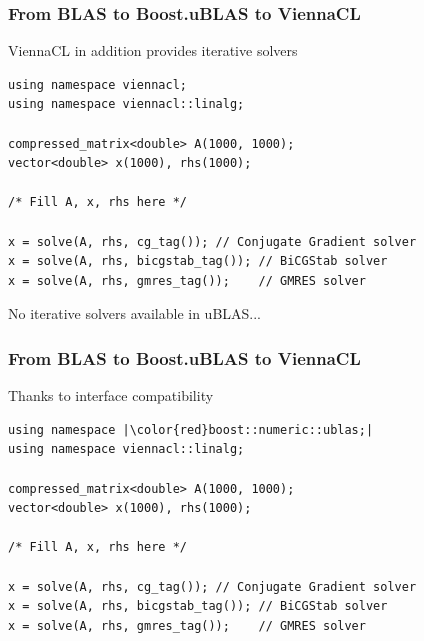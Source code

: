 \begin{frame}[fragile]
\frametitle{From BLAS to Boost.uBLAS to ViennaCL}
\begin{block}{ViennaCL in addition provides iterative solvers}
  \begin{lstlisting}
using namespace viennacl;
using namespace viennacl::linalg;

compressed_matrix<double> A(1000, 1000);
vector<double> x(1000), rhs(1000);

/* Fill A, x, rhs here */

x = solve(A, rhs, cg_tag()); // Conjugate Gradient solver
x = solve(A, rhs, bicgstab_tag()); // BiCGStab solver
x = solve(A, rhs, gmres_tag());    // GMRES solver
  \end{lstlisting}
\end{block}

 \begin{block}{No iterative solvers available in uBLAS...}
 \end{block}
\end{frame}


\begin{frame}[fragile]
\frametitle{From BLAS to Boost.uBLAS to ViennaCL}
\begin{block}{Thanks to interface compatibility}
  \begin{lstlisting}
using namespace |\color{red}boost::numeric::ublas;|
using namespace viennacl::linalg;

compressed_matrix<double> A(1000, 1000);
vector<double> x(1000), rhs(1000);

/* Fill A, x, rhs here */

x = solve(A, rhs, cg_tag()); // Conjugate Gradient solver
x = solve(A, rhs, bicgstab_tag()); // BiCGStab solver
x = solve(A, rhs, gmres_tag());    // GMRES solver
  \end{lstlisting} 
\end{block}

\vspace{1.15cm}

\end{frame}



